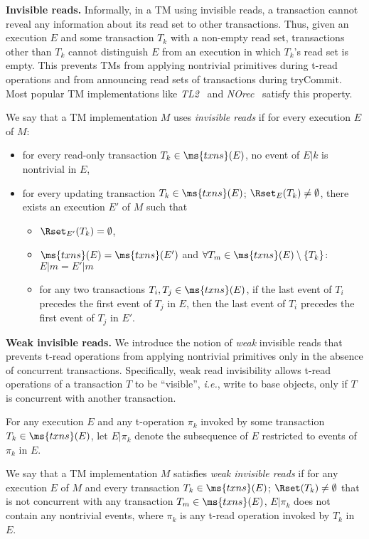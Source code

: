 \vspace{1mm}\noindent\textbf{Invisible reads.}
Informally, in a TM using invisible reads, 
a transaction cannot reveal any information about its read set to
other transactions. Thus, given an execution $E$ and some transaction
$T_k$ with a non-empty read set, transactions other than $T_k$ cannot
distinguish $E$ from an execution in which $T_k$'s read set is empty.
This prevents TMs from applying nontrivial primitives
during t-read operations and from announcing read sets of transactions during tryCommit.
Most popular TM implementations like \emph{TL2}~\cite{DSS06} and
\emph{NOrec}~\cite{norec} satisfy this property.
\begin{definition}
We say that a TM implementation $M$ uses \emph{invisible reads} if
for every execution $E$ of $M$:
\begin{itemize}
\item
for every read-only transaction $T_k \in \ms{txns}(E)$, 
no event of $E|k$ is nontrivial in $E$, 
\item
for every updating transaction $T_k \in \ms{txns}(E)$; $\Rset_E(T_k)\neq \emptyset$, 
there exists an execution $E'$ of $M$ such that
\begin{itemize}
\item
$\Rset_{E'}(T_k)=\emptyset$,
\item
$\ms{txns}(E)=\ms{txns}(E')$ and $\forall T_m \in \ms{txns}(E) \setminus \{T_k\}$: $E|m=E'|m$
\item
for any two transactions $T_i, T_j \in \ms{txns}(E)$, 
if the last event of $T_i$ precedes the first event of $T_j$ in $E$, 
then the last event of $T_i$ precedes the first event of $T_j$ in $E'$.
\end{itemize}
\end{itemize}
\end{definition}
\vspace{1mm}\noindent\textbf{Weak invisible reads.}
We introduce the notion of \emph{weak} invisible reads that prevents t-read operations
from applying nontrivial primitives only in the absence of concurrent transactions.
Specifically, weak read invisibility allows t-read operations of a transaction
$T$ to be ``visible'', \emph{i.e.}, write to base objects, only if $T$ is concurrent with
another transaction.
\begin{definition}
For any execution $E$ and any t-operation $\pi_k$ invoked by some transaction $T_k\in \ms{txns}(E)$,
let $E|\pi_k$ denote the subsequence of $E$ restricted to events of $\pi_k$ in $E$.

We say that a TM implementation $M$ satisfies \emph{weak invisible reads}
if for any execution $E$ of $M$ and every transaction $T_k\in \ms{txns}(E)$; $\Rset(T_k)\neq \emptyset$ that is
not concurrent with any transaction $T_m\in \ms{txns}(E)$, $E|\pi_k$ does not contain any nontrivial events, where $\pi_k$ is
any t-read operation invoked by $T_k$ in $E$.
\end{definition}
